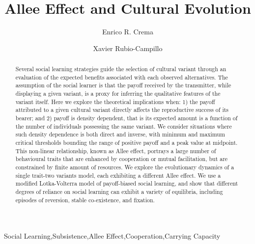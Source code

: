 \documentclass[review,authoryear]{elsarticle}
\begin{document}
\begin{frontmatter}

\title{Allee Effect and Cultural Evolution}


\author[label1,label2]{Enrico R. Crema}
\author[label3]{Xavier Rubio-Campillo}

\address[label1]{CaSEs - Complexity and Socio-Ecological Dynamics Research Group, Barcelona}
\address[label2]{UCL Institute of Archaeology}
\address[label3]{BSC - Barcelona Supercomputing Center}



\begin{abstract}
Several social learning strategies guide the selection of cultural variant through an evaluation of the expected benefits associated with each observed alternatives. The assumption of the social learner is that the payoff received by the transmitter, while displaying a given variant, is a proxy for  inferring the qualitative features of the variant itself. Here we explore the theoretical implications when: 1) the payoff attributed to a given cultural variant directly affects the reproductive success of its bearer;  and 2) payoff is density dependent, that is its expected amount is a function of the number of individuals possessing the same variant. We consider situations where such density dependence is both direct and inverse, with minimum and maximum critical thresholds bounding the range of positive payoff and a peak value at midpoint. This non-linear relationship, known as Allee effect, portrays a large number of behavioural traits that are enhanced by cooperation or mutual facilitation, but are constrained by finite amount of resources.  We explore the evolutionary dynamics of a single trait-two variants model, each exhibiting a different Allee effect. We use a modified Lotka-Volterra model of payoff-biased social learning, and show that different degrees of reliance on social learning can exhibit a variety of equilibria, including episodes of reversion, stable co-existence, and fixation.

\end{abstract}

\begin{keyword}
Social Learning\sep Subsistence\sep Allee Effect\sep Cooperation\sep Carrying Capacity
\end{keyword}

\end{frontmatter}
\end{document}
